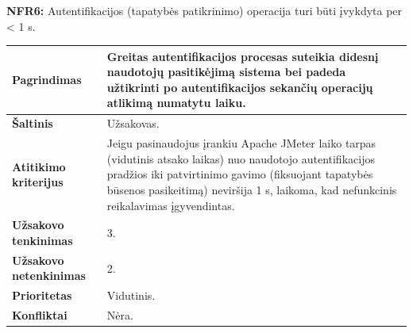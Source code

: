 \documentclass[12pt]{article}
\begin{document}
\noindent \textbf{NFR6:} Autentifikacijos (tapatybės patikrinimo) operacija turi
būti įvykdyta per < 1 s.
\label{sec:NFR6}
\begin{table}[htb!]
    \captionsetup{justification=centering}
    \vskip -10pt
    \begin{tabular}{|m{4.9cm}|m{11cm}|}
        \hline
        \raggedleft \textbf{\cellcolor{deepchampagne}Pagrindimas} &
        Greitas autentifikacijos procesas suteikia didesnį naudotojų
        pasitikėjimą sistema bei padeda užtikrinti po autentifikacijos sekančių
        operacijų atlikimą numatytu laiku. \\
        \hline
        \raggedleft \textbf{\cellcolor{deepchampagne}Šaltinis} & Užsakovas. \\
        \hline
        \raggedleft \textbf{\cellcolor{deepchampagne}Atitikimo kriterijus} & 
        Jeigu pasinaudojus įrankiu Apache JMeter laiko tarpas (vidutinis atsako
        laikas) nuo naudotojo autentifikacijos pradžios iki patvirtinimo gavimo
        (fiksuojant tapatybės būsenos pasikeitimą) neviršija 1 s, laikoma, kad
        nefunkcinis reikalavimas įgyvendintas. \\
        \hline
        \raggedleft \textbf{\cellcolor{deepchampagne}Užsakovo tenkinimas} & 3. \\
        \hline
        \raggedleft \textbf{\cellcolor{deepchampagne}Užsakovo netenkinimas} & 2. \\
        \hline
        \raggedleft \textbf{\cellcolor{deepchampagne}Prioritetas} & Vidutinis. \\
        \hline
        \raggedleft \textbf{\cellcolor{deepchampagne}Konfliktai} & Nėra. \\
        \hline
    \end{tabular}
\end{table}
\end{document}
